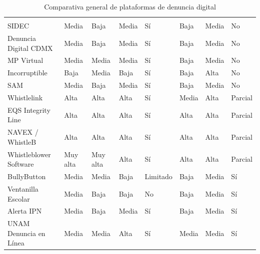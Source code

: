 \footnotesize
\renewcommand{\arraystretch}{1.2}
\setlength{\tabcolsep}{3pt}
\begin{longtable}{|L{2.9cm}|L{1.6cm}|L{1.7cm}|L{1.75cm}|L{1.6cm}|L{1.9cm}|L{1.75cm}|L{1.75cm}|}
\caption{Comparativa general de plataformas de denuncia digital}\label{tab:comparativa_plataformas} \\
\hline
{}
 &  &  &  &  &  &  &  \\
\hline
\endfirsthead
\hline
{}
 &  &  &  &  &  &  &  \\
\hline
\endhead
SIDEC & Media & Baja & Media & Sí & Baja & Media & No \\ \hline
Denuncia Digital CDMX & Media & Baja & Media & Sí & Baja & Media & No \\ \hline
MP Virtual & Media & Media & Media & Sí & Baja & Media & No \\ \hline
Incorruptible & Baja & Media & Baja & Sí & Baja & Alta & No \\ \hline
SAM & Media & Baja & Media & Sí & Baja & Media & No \\ \hline
Whistlelink & Alta & Alta & Alta & Sí & Media & Alta & Parcial \\ \hline
EQS Integrity Line & Alta & Alta & Alta & Sí & Alta & Alta & Parcial \\ \hline
NAVEX / WhistleB & Alta & Alta & Alta & Sí & Alta & Alta & Parcial \\ \hline
Whistleblower Software & Muy alta & Muy alta & Alta & Sí & Alta & Alta & Parcial \\ \hline
BullyButton & Media & Media & Baja & Limitado & Baja & Media & Sí \\ \hline
Ventanilla Escolar & Media & Baja & Baja & No & Baja & Media & Sí \\ \hline
Alerta IPN & Media & Baja & Media & Sí & Baja & Media & Sí \\ \hline
UNAM Denuncia en Línea & Media & Media & Alta & Sí & Media & Media & Sí \\ \hline
\end{longtable}
\normalsize
\setlength{\tabcolsep}{6pt}
\renewcommand{\arraystretch}{1}

